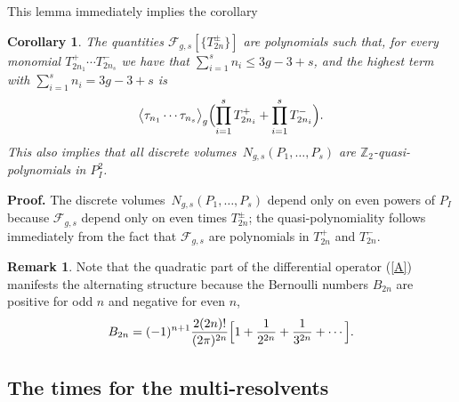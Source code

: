 \documentclass[11pt]{article}
\def\<{\langle}
\def\>{\rangle}
\theoremstyle{plain}
\newtheorem{corollary}{Corollary}
\theoremstyle{definition}
\newtheorem{remark}{Remark}
\newcommand {\dvol}{discrete volumes}%
\begin{document}
This lemma immediately implies the corollary
\begin{corollary}\label{cor:polynom}
The quantities ${\mathcal F}_{g,s}[\{T^\pm_{2n}\}]$ are polynomials such that, for every monomial
$T^+_{2n_1}\cdots T^-_{2n_s}$ we have that $\sum_{i=1}^s n_i\le 3g-3+s$, and the highest term
with $\sum_{i=1}^s n_i= 3g-3+s$ is
$$
\bigl\<\tau_{n_1}\cdots \tau_{n_s}\bigr\>_g\Bigl(\prod_{i=1}^s T^+_{2n_i}+\prod_{i=1}^s T^-_{2n_i}\Bigr).
$$
This also implies that all \dvol\  $N_{g,s}(P_1,\dots,P_s)$ are ${\mathbb Z}_2$-quasi-polynomials in $P^2_I$.
\end{corollary}

\noindent
{\bf Proof.}  The \dvol\  $N_{g,s}(P_1,\dots,P_s)$
depend only on even powers of $P_I$ because ${\mathcal F}_{g,s}$ depend only on even times
$T^\pm_{2n}$; the quasi-polynomiality follows immediately from the fact that ${\mathcal F}_{g,s}$ are
polynomials in $T^+_{2n}$ and $T^-_{2n}$.

\begin{remark}\label{rm:alternative}
Note that the quadratic part of the differential operator (\ref{A}) manifests the alternating structure 
because the Bernoulli numbers $B_{2n}$ are positive for odd $n$ and negative for even $n$,
$$
B_{2n}=(-1)^{n+1} \frac{2(2n)!}{(2\pi)^{2n}}\Bigl[1+\frac{1}{2^{2n}}+\frac{1}{3^{2n}}+\cdots\Bigr].
$$
\end{remark}

\subsection{The times for the multi-resolvents}\label{ss:multi-times}
\end{document}
